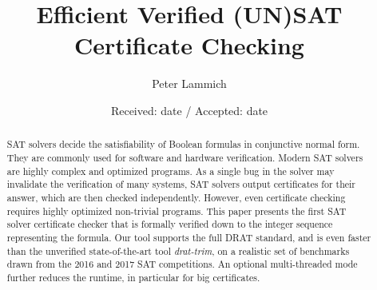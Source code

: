 \documentclass[smallcondensed]{svjour3}     %
\begin{document}
\title{Efficient Verified (UN)SAT Certificate Checking}

\author{Peter Lammich}


\date{Received: date / Accepted: date}

\maketitle

\begin{abstract}
SAT solvers decide the satisfiability of Boolean formulas in conjunctive normal form. 
They are commonly used for software and hardware verification.
Modern SAT solvers are highly complex and optimized programs. 
As a single bug in the solver may invalidate the verification of many systems, 
SAT solvers output certificates for their answer, which are then checked independently.
However, even certificate checking requires highly optimized non-trivial programs.
This paper presents the first SAT solver certificate checker that is 
formally verified down to the integer sequence representing the formula.
Our tool supports the full DRAT standard, and is even faster than the unverified state-of-the-art tool {\sl drat-trim}, 
on a realistic set of benchmarks drawn from the 2016 and 2017 SAT competitions. An optional multi-threaded mode further
reduces the runtime, in particular for big certificates.
\end{abstract}

% 
% 
\end{document}
